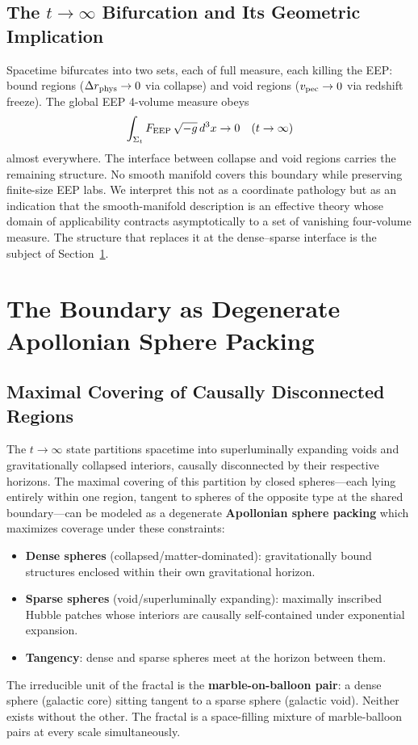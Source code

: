 \documentclass[11pt,letterpaper]{article}
\begin{document}
\subsection{The $t\to\infty$ Bifurcation and Its Geometric Implication}
Spacetime bifurcates into two sets, each of full measure, each killing the EEP:
bound regions ($\Delta r_{\rm phys}\to 0$ via collapse) and void regions
($v_{\rm pec}\to 0$ via redshift freeze). The global EEP 4-volume measure obeys
\begin{equation}
\int_{\Sigma_t}F_{\rm EEP}\,\sqrt{-g}\,d^3x\to 0\quad(t\to\infty)
\end{equation}
almost everywhere. The interface between collapse and void regions carries the
remaining structure. No smooth manifold covers this boundary while preserving
finite-size EEP labs. We interpret this not as a coordinate pathology but as an
indication that the smooth-manifold description is an effective theory whose domain
of applicability contracts asymptotically to a set of vanishing four-volume measure.
The structure that replaces it at the dense--sparse interface is the subject of
Section~\ref{sec:apollonian_geometry}.

\section{The Boundary as Degenerate Apollonian Sphere Packing}
\label{sec:apollonian_geometry}

\subsection{Maximal Covering of Causally Disconnected Regions}
The $t\to\infty$ state partitions spacetime into superluminally expanding voids and
gravitationally collapsed interiors, causally disconnected by their respective
horizons. The maximal covering of this partition by closed spheres---each lying
entirely within one region, tangent to spheres of the opposite type at the shared
boundary---can be modeled as a degenerate \textbf{Apollonian sphere packing} which
maximizes coverage under these constraints:
\begin{itemize}
\item \textbf{Dense spheres} (collapsed/matter-dominated): gravitationally bound
    structures enclosed within their own gravitational horizon.
\item \textbf{Sparse spheres} (void/superluminally expanding): maximally inscribed
    Hubble patches whose interiors are causally self-contained under exponential
    expansion.
\item \textbf{Tangency}: dense and sparse spheres meet at the horizon between them.
\end{itemize}
The irreducible unit of the fractal is the \textbf{marble-on-balloon pair}: a dense
sphere (galactic core) sitting tangent to a sparse sphere (galactic void). Neither
exists without the other. The fractal is a space-filling mixture of marble-balloon
pairs at every scale simultaneously.
\end{document}
